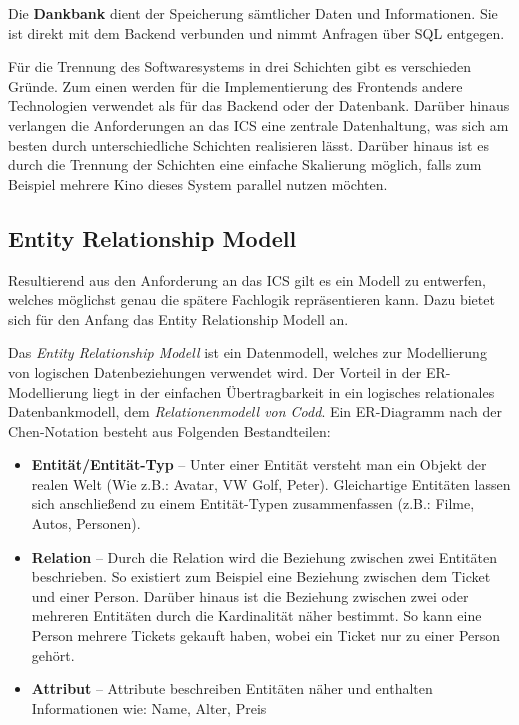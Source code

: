		Die \textbf{Dankbank} dient der Speicherung sämtlicher Daten und Informationen. Sie ist direkt mit dem Backend verbunden und nimmt Anfragen über SQL entgegen. 
		
		Für die Trennung des Softwaresystems in drei Schichten gibt es verschieden Gründe. Zum einen werden für die Implementierung des Frontends andere Technologien verwendet als für das Backend oder der Datenbank. Darüber hinaus verlangen die Anforderungen an das \ac{ICS} eine zentrale Datenhaltung, was sich am besten durch unterschiedliche Schichten realisieren lässt. Darüber hinaus ist es durch die Trennung der Schichten eine einfache Skalierung möglich, falls zum Beispiel mehrere Kino dieses System parallel nutzen möchten.
		\subsection{Entity Relationship Modell}\label{chapter:er-diagramm}
		Resultierend aus den Anforderung an das \ac{ICS} gilt es ein Modell zu entwerfen, welches möglichst genau die spätere Fachlogik repräsentieren kann. Dazu bietet sich für den Anfang das \glqq Entity Relationship Modell\grqq{} an.
			
		Das \textit{\glqq Entity Relationship Modell\grqq{}} ist ein Datenmodell, welches zur Modellierung von logischen Datenbeziehungen verwendet wird. Der Vorteil in der ER-Modellierung liegt in der einfachen Übertragbarkeit in ein logisches relationales Datenbankmodell, dem \textit{Relationenmodell von Codd}. Ein ER-Diagramm nach der Chen-Notation besteht aus Folgenden Bestandteilen:\autocite[Vgl.][]{Stobitzer.0130201914:40Uhr}
			\begin{itemize}
				\item \textbf{Entität/Entität-Typ} -- Unter einer Entität versteht man ein Objekt der realen Welt (Wie z.B.: Avatar, VW Golf, Peter). Gleichartige Entitäten lassen sich anschließend zu einem Entität-Typen zusammenfassen (z.B.: Filme, Autos, Personen).\autocite[Vgl.][]{Stobitzer.0130201914:40Uhr} 
				\item \textbf{Relation} -- Durch die Relation wird die Beziehung zwischen zwei Entitäten beschrieben. So existiert zum Beispiel eine Beziehung zwischen dem Ticket und einer Person. Darüber hinaus ist die Beziehung zwischen zwei oder mehreren Entitäten durch die Kardinalität näher bestimmt. So kann eine Person mehrere Tickets gekauft haben, wobei ein Ticket nur zu einer Person gehört.\autocite[Vgl.][]{Stobitzer.0130201914:40Uhr}
				\item \textbf{Attribut} -- Attribute beschreiben Entitäten näher und enthalten Informationen wie: Name, Alter, Preis
			\end{itemize}
		
